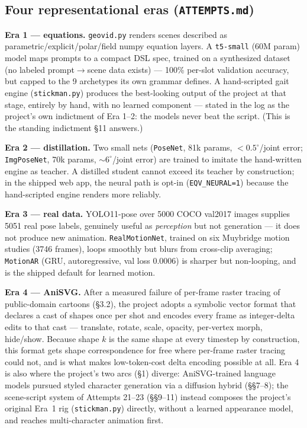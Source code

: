 \documentclass[11pt]{article}
\newcommand{\secsym}{\S}
\begin{document}
\subsection{Four representational eras (\texttt{ATTEMPTS.md})}
\label{sec:eras}

\textbf{Era 1 --- equations.} \texttt{geovid.py} renders scenes described
as parametric/explicit/polar/field numpy equation layers. A
\texttt{t5-small} (60M param) model maps prompts to a compact DSL spec,
trained on a synthesized dataset (no labeled prompt$\rightarrow$scene data
exists) --- 100\% per-slot validation accuracy, but capped to the 9
archetypes its own grammar defines. A hand-scripted gait engine
(\texttt{stickman.py}) produces the best-looking output of the project at
that stage, entirely by hand, with no learned component --- stated in the
log as the project's own indictment of Era 1--2: the models never beat the
script. (This is the standing indictment \secsym11 answers.)

\textbf{Era 2 --- distillation.} Two small nets (\texttt{PoseNet}, 81k
params, $<0.5^\circ$/joint error; \texttt{ImgPoseNet}, 70k params,
$\sim6^\circ$/joint error) are trained to imitate the hand-written engine
as teacher. A distilled student cannot exceed its teacher by construction;
in the shipped web app, the neural path is opt-in
(\texttt{EQV\_NEURAL=1}) because the hand-scripted engine renders more
reliably.

\textbf{Era 3 --- real data.} YOLO11-pose over 5000 COCO val2017 images
supplies 5051 real pose labels, genuinely useful as \emph{perception} but
not generation --- it does not produce new animation. \texttt{RealMotionNet},
trained on six Muybridge motion studies (3746 frames), loops smoothly but
blurs from cross-clip averaging; \texttt{MotionAR} (GRU, autoregressive,
val loss 0.0006) is sharper but non-looping, and is the shipped default
for learned motion.

\textbf{Era 4 --- AniSVG.} After a measured failure of per-frame raster
tracing of public-domain cartoons (\secsym3.2), the project adopts a
symbolic vector format that declares a cast of shapes once per shot and
encodes every frame as integer-delta edits to that cast --- translate,
rotate, scale, opacity, per-vertex morph, hide/show. Because shape $k$ is
the same shape at every timestep by construction, this format gets shape
correspondence for free where per-frame raster tracing could not, and is
what makes low-token-cost delta encoding possible at all. Era 4 is also
where the project's two arcs (\secsym1) diverge: AniSVG-trained language
models pursued styled character generation via a diffusion hybrid
(\secsym\secsym7--8); the scene-script system of Attempts 21--23
(\secsym\secsym9--11) instead composes the project's original Era~1 rig
(\texttt{stickman.py}) directly, without a learned appearance model, and
reaches multi-character animation first.
\end{document}
